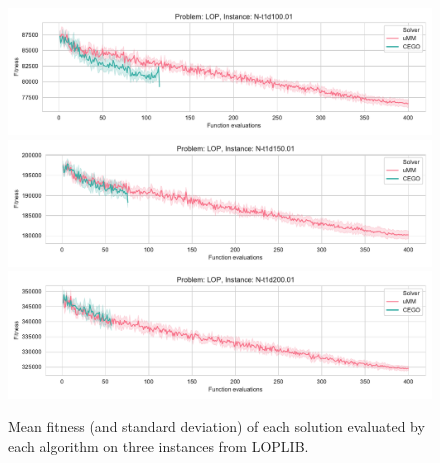 \documentclass[runningheads]{llncs}
\begin{document}
\begin{figure}[tb]
  \centering%
  \includegraphics[width=\textwidth]{img/fitness_real_lop_RandA1_N-t1d100_01}\\
  \includegraphics[width=\textwidth]{img/fitness_real_lop_RandA1_N-t1d150_01}\\
  \includegraphics[width=\textwidth]{img/fitness_real_lop_RandA1_N-t1d200_01}\\
    \caption{Mean fitness  (and standard deviation)  of each solution evaluated by each algorithm on three instances from LOPLIB.\label{fig:loplib}}
  \end{figure}
\end{document}
